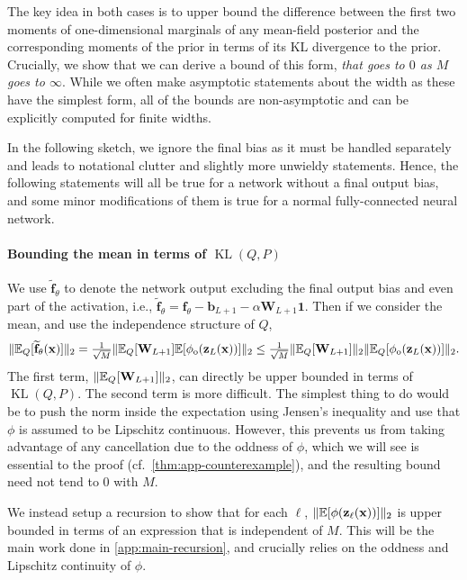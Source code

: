 \documentclass[twoside]{article}
\renewcommand{\ss}[1]{_{\text{#1}}}
\newcommand{\vb}{\mathbf{b}}
\newcommand{\vf}{\mathbf{f}}
\newcommand{\vx}{\mathbf{x}}
\newcommand{\vz}{\mathbf{z}}
\newcommand{\vone}{\mathbf{1}}
\newcommand{\mW}{\mathbf{W}}
\newcommand{\E}{\mathbb{E}}
\renewcommand{\P}{\mathbb{P}}
\newcommand{\Q}{\mathbb{Q}}
\renewcommand{\Q}{\ensuremath{Q}}
\renewcommand{\P}{\ensuremath{P}}
\newcommand{\KL}{\operatorname{KL}}
\renewcommand{\ss}[1]{_{\text{#1}}}        %
\DeclarePairedDelimiter\norm{\|}{\|}             %
\theoremstyle{theoremstyle}
\begin{document}
 The key idea in both cases is to upper bound the difference between the first two moments of one-dimensional marginals of any mean-field posterior and the corresponding moments of the prior in terms of its KL divergence to the prior. Crucially, we show that we can derive a bound of this form, \emph{that goes to $0$ as $M$ goes to $\infty$}. While we often make asymptotic statements about the width as these have the simplest form, all of the bounds are non-asymptotic and can be explicitly computed for finite widths.

In the following sketch, we ignore the final bias as it must be handled separately and leads to notational clutter and slightly more unwieldy statements. Hence, the following statements will all be true for a network without a final output bias, and some minor modifications of them is true for a normal fully-connected neural network.
\paragraph{Bounding the mean in terms of $\KL(\Q,\P)$}
We use $\widetilde{\vf}_{\theta}$ to denote the network output excluding the final output bias and even part of the activation, i.e., $\widetilde{\vf}_{\theta} = \vf_{\theta} - \vb_{L+1} - \alpha \mW_{L+1}\vone$. Then if we consider the mean, and use the independence structure of $\Q$,
\begin{align}
    \|\E_{\Q}[\widetilde{\vf}_{\theta}(\vx)]\|_2 = \tfrac1{\sqrt{M}} \norm{\E_{Q}[\mW_{L+1}]\E[\phi\ss{o}(\vz_L(\vx))]}_2 \leq \tfrac1{\sqrt{M}} \norm{\E_{Q}[\mW_{L+1}]}_2\norm{\E_{\Q}[\phi\ss{o}(\vz_L(\vx))]}_2. \label{eqn:mean-top-layer}
\end{align}
The first term, $\norm{\E_{Q}[\mW_{L+1}]}_2$, can directly be upper bounded in terms of $\KL(\Q,\P)$. The second term is more difficult. The simplest thing to do would be to push the norm inside the expectation using Jensen's inequality and use that $\phi$ is assumed to be Lipschitz continuous. However, this prevents us from taking advantage of any cancellation due to the oddness of $\phi$, which we will see is essential to the proof (cf.~\cref{thm:app-counterexample}), and the resulting bound need not tend to $0$ with $M$.

We instead setup a recursion to show that for each $\ell$, $\norm{\E[\phi(\vz_\ell(\vx))]}_2$ is upper bounded in terms of an expression that is independent of $M$. This will be the main work done in \cref{app:main-recursion}, and crucially relies on the oddness and Lipschitz continuity of $\phi$.
\end{document}
